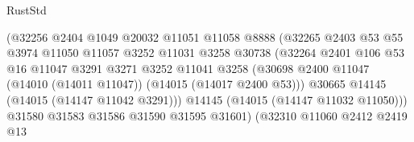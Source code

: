 \begin{lexlean}{RustStd}
\begin{coremodule}
                                        (@32256
                                          @2404
                                          @1049
                                          @20032
                                          @11051
                                          @11058
                                          @8888
                                          (@32265
                                            @2403
                                            @53
                                            @55
                                            @3974
                                            @11050
                                            @11057
                                            @3252
                                            @11031
                                            @3258
                                            @30738
                                            (@32264
                                              @2401
                                              @106
                                              @53
                                              @16
                                              @11047
                                              @3291
                                              @3271
                                              @3252
                                              @11041
                                              @3258
                                              (@30698
                                                @2400
                                                @11047
                                                (@14010 (@14011 @11047))
                                                (@14015 (@14017 @2400 @53)))
                                              @30665
                                              @14145
                                              (@14015 (@14147 @11042 @3291)))
                                            @14145
                                            (@14015 (@14147 @11032 @11050)))
                                          @31580
                                          @31583
                                          @31586
                                          @31590
                                          @31595
                                          @31601)
                                        (@32310
                                          @11060
                                          @2412
                                          @2419
                                          @13

\end{coremodule}
\end{lexlean}
